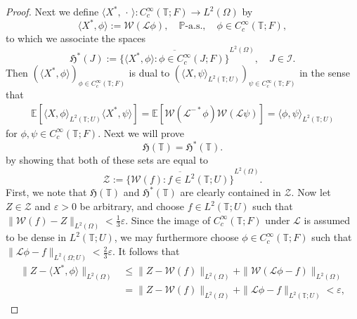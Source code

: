 \documentclass[reqno]{amsart}
\numberwithin{equation}{section}
\newcommand{\bbP}{\mathbb{P}}
\newcommand{\bbT}{\mathbb{T}}
\newcommand{\E}{\mathbb{E}}
\newcommand{\cL}{\mathcal{L}}
\newcommand{\norm}[2]{     \| #1       \|_{ #2 }}
\newcommand{\from}{\colon}
\newcommand{\clos}[1]{\overline{ #1 }}
\theoremstyle{remark}
\theoremstyle{definition}
\begin{document}
\begin{proof}
	Next we define
	$\langle X^*, \,\cdot\, \rangle \from C_c^\infty(\bbT; F) \to L^2(\Omega)$
	by 
	\begin{equation}\label{eq:dual-field}
		\langle X^*, \phi \rangle := \mathscr W(\cL \phi), 
		\quad \bbP\text{-a.s.},
		\quad \phi \in C_c^\infty(\bbT; F),
	\end{equation}
	to which we associate the spaces
	\begin{equation}\label{eq:def-HstarJ}
		\mathfrak H^*(J)
		:= 
		\clos{\{ \langle X^*, \phi \rangle : \phi \in C_c^\infty(J; F) \}}^{L^2(\Omega)}, 
		\quad 
		J \in \mathscr I.
	\end{equation}
	Then $(\langle X^*, \phi \rangle)_{\phi \in C_c^\infty(\bbT; F)}$ is dual to 
	$(\langle X, \psi \rangle_{L^2(\bbT;U)})_{\psi \in C_c^\infty(\bbT; F)}$
	in the sense that
	\begin{equation}\label{eq:dual-process}
		\begin{aligned}
			\E[\langle X, \phi \rangle_{L^2(\bbT; U)} \langle X^*, \psi \rangle]
			=
			\E[\mathscr W(\cL^{-*} \phi) \mathscr W(\cL \psi)]
			=
			\langle \phi , \psi \rangle_{L^2(\bbT; U)}
		\end{aligned}
	\end{equation}
	for $\phi, \psi \in C_c^\infty(\bbT; F)$.
	Next we will prove
	\begin{equation}
		\mathfrak H(\bbT) = \mathfrak H^*(\bbT). \label{eq:duality-condition-1}
	\end{equation}
	by showing that both of these sets are equal to
	\[
	\mathscr Z := \clos{\{\mathscr W(f) : f \in L^2(\bbT; U)\}}^{L^2(\Omega)}.
	\]
	First, we note that $\mathfrak H(\bbT)$ and $\mathfrak H^*(\bbT)$
	are clearly contained in $\mathscr Z$.
	Now let $Z \in \mathscr Z$ and $\varepsilon > 0$ be arbitrary, and choose
	$f \in L^2(\bbT; U)$ such that $\norm{\mathscr W(f) - Z}{L^2(\Omega)} < \frac{1}{3}\varepsilon$.
	Since the image of $C_c^\infty(\bbT; F)$ under $\cL$ is assumed to be dense in $L^2(\bbT; U)$, 
	we may furthermore choose $\phi \in C_c^\infty(\bbT; F)$ such that 
	$\norm{\cL \phi - f}{L^2(\Omega; U)} < \frac{2}{3}\varepsilon$.
	It follows that
	\[
	\begin{aligned}
		\norm{Z - \langle X^*, \phi\rangle }{L^2(\Omega)}
		&\le 
		\norm{Z - \mathscr W(f)}{L^2(\Omega)}
		+
		\norm{\mathscr W(\cL\phi - f)}{L^2(\Omega)}
		\\&=
		\norm{Z - \mathscr W(f)}{L^2(\Omega)}
		+
		\norm{\cL\phi - f}{L^2(\bbT; U)} < \varepsilon,
	\end{aligned}
\]
\end{proof}
\end{document}
